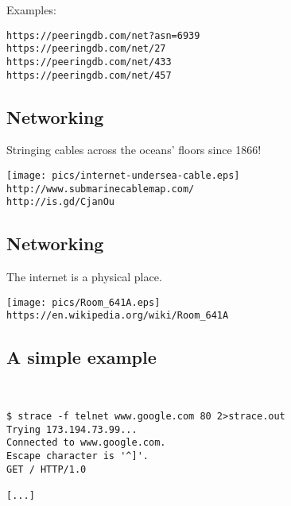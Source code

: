 \documentclass[xga]{xdvislides}
\begin{document}
Examples:
\begin{verbatim}
https://peeringdb.com/net?asn=6939
https://peeringdb.com/net/27
https://peeringdb.com/net/433
https://peeringdb.com/net/457
\end{verbatim}

\subsection{Networking}
Stringing cables across the oceans' floors since 1866!
\vspace*{\fill}
\begin{center}
	\texttt{[image: pics/internet-undersea-cable.eps]} \\
	\verb+http://www.submarinecablemap.com/+ \\
	\verb+http://is.gd/CjanOu+
\end{center}
\vspace*{\fill}

\subsection{Networking}
The internet is a physical place. \\
\begin{center}
\vspace*{\fill}
	\texttt{[image: pics/Room\_641A.eps]} \\
\vspace*{\fill}
{\tt https://en.wikipedia.org/wiki/Room\_641A}
\end{center}



\subsection{A simple example}
\\
\Hugesize
\begin{center}
\begin{verbatim}
$ strace -f telnet www.google.com 80 2>strace.out
Trying 173.194.73.99...
Connected to www.google.com.
Escape character is '^]'.
GET / HTTP/1.0

[...]
\end{verbatim}
\end{center}
\Normalsize
\vspace*{\fill}
\end{document}

